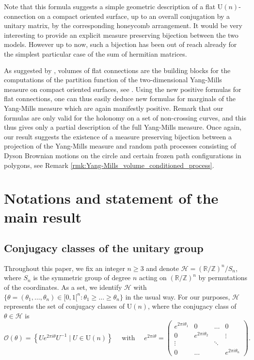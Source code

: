 \documentclass[11pt,a4paper]{amsart}
\providecommand{\U}{\mathrm U}
\numberwithin{equation}{section}
\theoremstyle{definition}
\begin{document}
Note that this formula suggests a simple geometric description of a flat $\U(n)$-connection on a compact oriented surface, 
 up to an overall conjugation by a unitary matrix, by the corresponding honeycomb arrangement. It would be very interesting 
 to provide an explicit measure preserving bijection between the two models. However up to now, such a bijection has been out of reach already 
 for the simplest particular case of the sum of hermitian matrices.

As suggested by \cite{Atiyah_Bott}, volumes of flat connections are the building blocks for the computations of the partition function 
of the two-dimensional Yang-Mills measure on compact oriented surfaces, see \cite[Section 2]{witten1992two}. 
Using the new positive formulas for flat connections, one can thus easily deduce new formulas for marginals of the Yang-Mills measure 
which are again manifestly positive. Remark that our formulas are only valid for the holonomy on a set of non-crossing curves, 
and this thus gives only a partial description of the full Yang-Mills measure. Once again, our result suggests the existence of a 
measure preserving bijection between a projection of the Yang-Mills measure and random path processes consisting of Dyson Brownian motions 
on the circle and certain frozen path configurations in polygons, see Remark \ref{rmk:Yang-Mills_volume_conditioned_process}.


\section{Notations and statement of the main result}
\subsection{Conjugacy classes of the unitary group}

Throughout this paper, we fix an integer 
$n \geqslant 3$ and denote
$\mathcal{H}=(\mathbb{R}/\mathbb{Z})^n/S_n$,
where $S_n$ is the symmetric
group of degree $n$ acting on
$(\mathbb R/\mathbb Z)^n$ by permutations
of the coordinates.
As a set, we identify $\mathcal H$ with $\{\theta=(\theta_1,\dots,\theta_n) 
\in [0,1[^n \colon \theta_1 \geqslant \dots \geqslant \theta_n\}$ in the usual way.
For our purposes, $\mathcal H$ represents
the set of conjugacy classes
of $\U(n)$, where
the conjugacy class of
$\theta \in \mathcal H$ is
\begin{equation*}
	\mathcal{O}(\theta) = 
	\left\lbrace Ue^{2\pi i\theta}U^{-1} \mid U\in \U(n)\right\rbrace
	\quad \text{ with } \quad e^{2\pi i\theta}=
	\begin{pmatrix} 
		e^{2\pi i \theta_1}&0&\dots& 0
		\\0&e^{2\pi i\theta_2}&& \vdots\\ 
		\vdots&&\ddots &\\
		0 & \hdots &&e^{2\pi i\theta_n}
	\end{pmatrix}.
\end{equation*}
\end{document}
